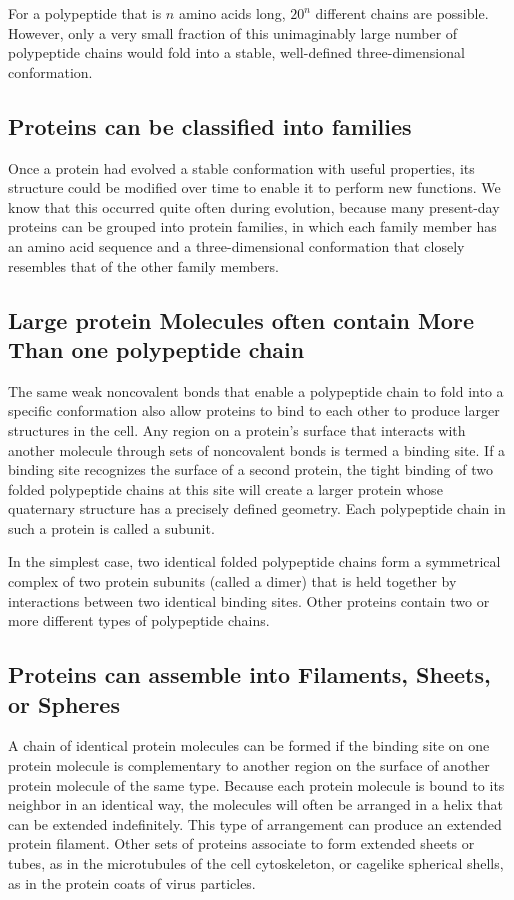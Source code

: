 For a polypeptide that is $n$ amino acids long, $20^n$ different chains are possible.
However, only a very small fraction of this unimaginably large number
of polypeptide chains would fold into a stable, well-defined three-dimensional conformation.

\subsection{Proteins can be classified into families}

Once a protein had evolved a stable conformation with useful properties,
its structure could be modified over time to enable it to perform
new functions. We know that this occurred quite often during evolution,
because many present-day proteins can be grouped into protein families,
in which each family member has an amino acid sequence and a
three-dimensional conformation that closely resembles that of the other
family members.

\subsection{Large protein Molecules often contain More Than one polypeptide chain}

The same weak noncovalent bonds that enable a polypeptide chain to
fold into a specific conformation also allow proteins to bind to each other
to produce larger structures in the cell. Any region on a protein’s surface
that interacts with another molecule through sets of noncovalent bonds
is termed a binding site.
If a binding site recognizes the surface
of a second protein, the tight binding of two folded polypeptide chains
at this site will create a larger protein whose quaternary structure has a
precisely defined geometry. Each polypeptide chain in such a protein is
called a subunit.

In the simplest case, two identical folded polypeptide chains form a symmetrical
complex of two protein subunits (called a dimer) that is held
together by interactions between two identical binding sites.
Other proteins contain two or more different types of polypeptide chains.

\subsection{Proteins can assemble into Filaments, Sheets, or Spheres}

A chain of identical protein molecules can be formed if the
binding site on one protein molecule is complementary to another region
on the surface of another protein molecule of the same type. Because
each protein molecule is bound to its neighbor in an identical way, the
molecules will often be arranged in a helix that can be extended indefinitely.
This type of arrangement can produce an extended protein filament.
Other sets of proteins associate to form extended sheets or tubes,
as in the microtubules of the cell cytoskeleton, or cagelike spherical shells,
as in the protein coats of virus particles.

